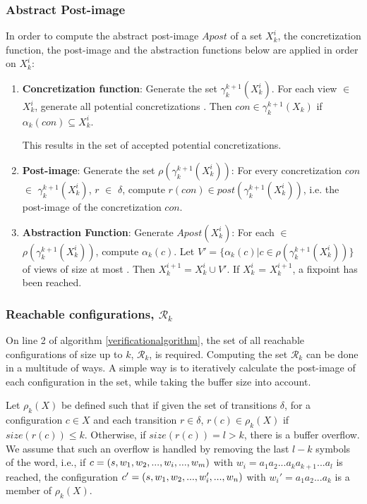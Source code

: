 \subsubsection{Abstract Post-image}
\label{part1}
In order to compute the abstract post-image $Apost$ of a set $X_k^i$, the concretization function, the post-image and the abstraction functions below are applied in order on $X_k^i$:


\begin{enumerate}
\item
\textbf{Concretization function}:
Generate the set $\gamma_k^{k+1}(X_k^i)$. For each view  $\in$ $X_k^i$, generate all potential concretizations . Then $con \in \gamma_k^{k+1}(X_k)$ if $\alpha_k(con) \subseteq X_k^i$.

This results in the set of accepted potential concretizations.

\item
\textbf{Post-image}:
Generate the set $\rho(\gamma_k^{k+1}(X_k^i))$: For every concretization $con$ $\in$ $\gamma_k^{k+1}(X_k^i)$, $r$ $\in$ $\delta$, compute $r(con) \in post(\gamma_k^{k+1}(X_k^i))$, i.e. the post-image of the concretization $con$.

\item
\textbf{Abstraction Function}:
Generate $Apost(X_k^i)$: For each  $\in$ $\rho(\gamma_k^{k+1}(X_k^i))$, compute $\alpha_k(c)$. Let $V' = \{\alpha_k(c)|c \in \rho(\gamma_k^{k+1}(X_k^i))\}$ of views of size at most . Then $X_k^{i+1} = X_k^i \cup V'$. If $X_k^i$ = $X_k^{i+1}$, a fixpoint has been reached.

\end{enumerate}

\subsubsection{Reachable configurations, $\mathcal{R}_k$}
\label{part2}
On line 2 of algorithm \ref{verificationalgorithm}, the set of all reachable configurations of size up to $k$, $\mathcal{R}_k$, is required. Computing the set $\mathcal{R}_k$ can be done in a multitude of ways. A simple way is to iteratively calculate the post-image of each configuration in the set, while taking the buffer size into account.

Let $\rho_k(X)$ be defined such that if given the set of transitions $\delta$, for a configuration $c \in X$ and each transition $r \in \delta$, $r(c) \in \rho_k(X)$ if $size(r(c)) \leq k$. Otherwise, if $size(r(c)) = l > k$, there is a buffer overflow. We assume that such an overflow is handled by removing the last $l-k$ symbols of the word, i.e., if $c = (s, w_1, w_2,..., w_i, ...,  w_m)$ with $w_i = a_1a_2...a_ka_{k+1}...a_l$ is reached, the configuration $c' = (s, w_1, w_2, ..., w_i', ..., w_n)$ with $w_i' = a_1a_2...a_k$ is a member of $\rho_k(X)$.

